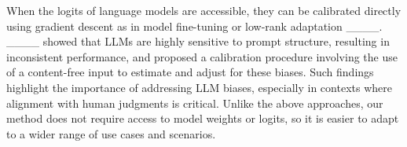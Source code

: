 When the logits of language models are accessible, they can be calibrated directly using gradient descent as in model fine-tuning or low-rank adaptation ____. ____ showed that LLMs are highly sensitive to prompt structure, resulting in inconsistent performance, and proposed a calibration procedure involving the use of a content-free input to estimate and adjust for these biases. Such findings highlight the importance of addressing LLM biases, especially in contexts where alignment with human judgments is critical.
%
Unlike the above approaches, our method does not require access to model weights or logits, so it is easier to adapt to a wider range of use cases and scenarios.


